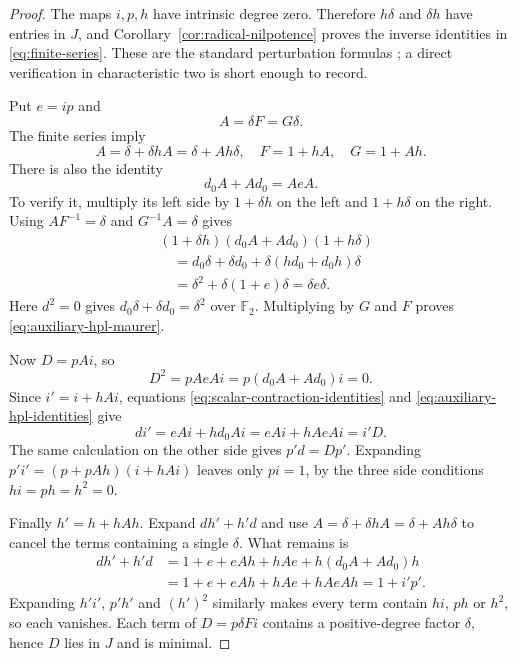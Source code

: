 \begin{proof}
The maps $i,p,h$ have intrinsic degree zero.  Therefore $h\delta$ and
$\delta h$ have entries in $J$, and
Corollary~\ref{cor:radical-nilpotence} proves the inverse identities in
\eqref{eq:finite-series}.  These are the standard perturbation formulas
\cite[Sections~2--3]{crainic}; a direct verification in characteristic two
is short enough to record.

Put $e=ip$ and
\[
 A=\delta F=G\delta.
\]
The finite series imply
\begin{equation}
 A=\delta+\delta hA=\delta+Ah\delta,
 \quad F=1+hA,\quad G=1+Ah.
 \label{eq:auxiliary-hpl-identities}
\end{equation}
There is also the identity
\begin{equation}
 d_0A+Ad_0=AeA.
 \label{eq:auxiliary-hpl-maurer}
\end{equation}
To verify it, multiply its left side by $1+\delta h$ on the left and
$1+h\delta$ on the right.  Using $AF^{-1}=\delta$ and
$G^{-1}A=\delta$ gives
\begin{align*}
 &(1+\delta h)(d_0A+Ad_0)(1+h\delta)\\
 &\quad=d_0\delta+\delta d_0
       +\delta(hd_0+d_0h)\delta\\
 &\quad=\delta^2+\delta(1+e)\delta=\delta e\delta.
\end{align*}
Here $d^2=0$ gives $d_0\delta+\delta d_0=\delta^2$ over
$\mathbb F_2$.  Multiplying by $G$ and $F$ proves
\eqref{eq:auxiliary-hpl-maurer}.

Now $D=pAi$, so
\[
 D^2=pAeAi=p(d_0A+Ad_0)i=0.
\]
Since $i'=i+hAi$, equations
\eqref{eq:scalar-contraction-identities} and
\eqref{eq:auxiliary-hpl-identities} give
\[
 di'=eAi+hd_0Ai=eAi+hAeAi=i'D.
\]
The same calculation on the other side gives $p'd=Dp'$.  Expanding
$p'i'=(p+pAh)(i+hAi)$ leaves only $pi=1$, by the three side conditions
$hi=ph=h^2=0$.

Finally $h'=h+hAh$.  Expand $dh'+h'd$ and use
$A=\delta+\delta hA=\delta+Ah\delta$ to cancel the terms containing a
single $\delta$.  What remains is
\begin{align*}
 dh'+h'd
 &=1+e+eAh+hAe+h(d_0A+Ad_0)h\\
 &=1+e+eAh+hAe+hAeAh=1+i'p'.
\end{align*}
Expanding $h'i'$, $p'h'$ and $(h')^2$ similarly makes every term contain
$hi$, $ph$ or $h^2$, so each vanishes.  Each term of $D=p\delta Fi$
contains a positive-degree factor $\delta$, hence $D$ lies in $J$ and is
minimal.
\end{proof}

